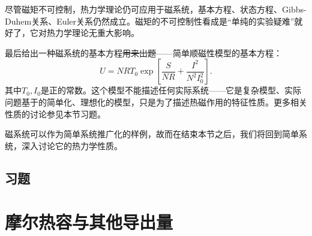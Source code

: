 尽管磁矩不可控制，热力学理论仍可应用于磁系统，基本方程、状态方程、Gibbs-Duhem关系、Euler关系仍然成立。磁矩的不可控制性看成是“单纯的实验疑难”就好了，它对热力学理论无重大影响。

最后给出一种磁系统的基本方程\sout{用来出题}——简单顺磁性模型的基本方程：
\begin{equation}
    U = NRT_0 \exp \left[ \frac{S}{NR} + \frac{I^2}{N^2 I_0^2} \right].
\label{equ3.66}
\end{equation}
其中$T_0, I_0$是正的常数。这个模型不能描述任何实际系统——它是复杂模型、实际问题基于的简单化、理想化的模型，只是为了描述热磁作用的特征性质。更多相关性质的讨论参见本节习题。

磁系统可以作为简单系统推广化的样例，故而在结束本节之后，我们将回到简单系统，深入讨论它的热力学性质。

\subsection*{习题}

\section{摩尔热容与其他导出量}
\label{sec3.9}
